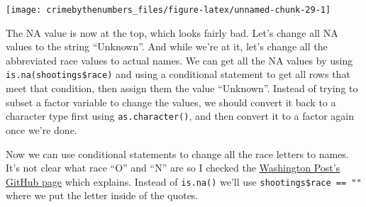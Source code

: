 \documentclass[
  12pt,
]{book}
\newenvironment{Shaded}{\begin{snugshade}}{\end{snugshade}}
\newcommand{\KeywordTok}[1]{\textcolor[rgb]{0.27,0.27,0.27}{\textbf{#1}}}
\newcommand{\NormalTok}[1]{#1}
\newcommand{\OperatorTok}[1]{\textcolor[rgb]{0.43,0.43,0.43}{\textbf{#1}}}
\newcommand{\StringTok}[1]{\textcolor[rgb]{0.5,0.5,0.5}{#1}}
\begin{document}
\begin{center}\texttt{[image: crimebythenumbers\_files/figure-latex/unnamed-chunk-29-1]} \end{center}

The NA value is now at the top, which looks fairly bad. Let's change all NA values to the string ``Unknown''. And while we're at it, let's change all the abbreviated race values to actual names. We can get all the NA values by using \texttt{is.na(shootings\$race)} and using a conditional statement to get all rows that meet that condition, then assign them the value ``Unknown''. Instead of trying to subset a factor variable to change the values, we should convert it back to a character type first using \texttt{as.character()}, and then convert it to a factor again once we're done.

\begin{Shaded}
\end{Shaded}

Now we can use conditional statements to change all the race letters to names. It's not clear what race ``O'' and ``N'' are so I checked the \href{https://github.com/washingtonpost/data-police-shootings}{Washington Post's GitHub page} which explains. Instead of \texttt{is.na()} we'll use \texttt{shootings\$race\ ==\ ""} where we put the letter inside of the quotes.

\begin{Shaded}
\end{Shaded}
\end{document}
